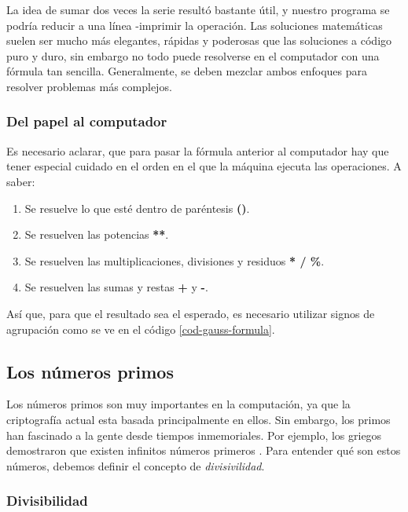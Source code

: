 La idea de sumar dos veces la serie resultó bastante útil, y nuestro programa se podría reducir a una línea -imprimir la operación. Las soluciones matemáticas suelen ser mucho más elegantes, rápidas y poderosas que las soluciones a código puro y duro, sin embargo no todo puede resolverse en el computador con una fórmula tan sencilla. Generalmente, se deben mezclar ambos enfoques para resolver problemas más complejos.



\subsubsection{Del papel al computador}

Es necesario aclarar, que para pasar la fórmula anterior al computador hay que tener especial cuidado en el orden en el que la máquina ejecuta las operaciones. A saber:

	\begin{enumerate}
	\item Se resuelve lo que esté dentro de paréntesis \textbf{()}.
	\item Se resuelven las potencias \textbf{**}.
	\item Se resuelven las multiplicaciones, divisiones y residuos  \textbf{* / \%}. 
	\item Se resuelven las sumas y restas  \textbf{+} y \textbf{-}.
	\end{enumerate}
	
Así que, para que el resultado sea el esperado, es necesario utilizar signos de agrupación como se ve en el código \ref{cod-gauss-formula}. \\




\subsection{Los números primos}

Los números primos son muy importantes en la computación, ya que la criptografía actual esta basada principalmente en ellos. Sin embargo, los primos han fascinado a la gente desde tiempos inmemoriales. Por ejemplo, los griegos demostraron que existen infinitos números primeros \cite{discretemath}. Para entender qué son estos números, debemos definir el concepto de \emph{divisivilidad}.

\subsubsection{Divisibilidad}

